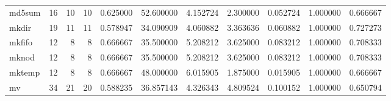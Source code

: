 \begin{longtable}{lrrrrrrrrrr}
md5sum    &                                      16 &                 10 &                                10 &                                   0.625000 &                              52.600000 &                                     4.152724 &                          2.300000 &                                0.052724 &                           1.000000 &                                           0.666667 \\
mkdir     &                                      19 &                 11 &                                11 &                                   0.578947 &                              34.090909 &                                     4.060882 &                          3.363636 &                                0.060882 &                           1.000000 &                                           0.727273 \\
mkfifo    &                                      12 &                  8 &                                 8 &                                   0.666667 &                              35.500000 &                                     5.208212 &                          3.625000 &                                0.083212 &                           1.000000 &                                           0.708333 \\
mknod     &                                      12 &                  8 &                                 8 &                                   0.666667 &                              35.500000 &                                     5.208212 &                          3.625000 &                                0.083212 &                           1.000000 &                                           0.708333 \\
mktemp    &                                      12 &                  8 &                                 8 &                                   0.666667 &                              48.000000 &                                     6.015905 &                          1.875000 &                                0.015905 &                           1.000000 &                                           0.666667 \\
mv        &                                      34 &                 21 &                                20 &                                   0.588235 &                              36.857143 &                                     4.326343 &                          4.809524 &                                0.100152 &                           1.000000 &                                           0.650794 \\

\end{longtable}
